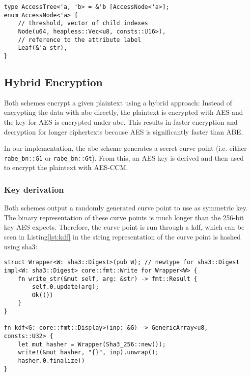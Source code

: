 \begin{lstlisting}[caption={Refined implementation of Access Trees (works without standard library)},label={lst:access-tree-heapless}]
type AccessTree<'a, 'b> = &'b [AccessNode<'a>];
enum AccessNode<'a> {
    // threshold, vector of child indexes
    Node(u64, heapless::Vec<u8, consts::U16>),
    // reference to the attribute label
    Leaf(&'a str),
}
\end{lstlisting}

\subsection{Hybrid Encryption}
Both schemes encrypt a given plaintext using a hybrid approach:
Instead of encrypting the data with \acrshort{abe} directly, the plaintext is encrypted with AES and the key for AES is encrypted under \acrshort{abe}.
This results in faster encryption and decryption for longer ciphertexts because AES is significantly faster than ABE.

In our implementation, the \acrshort{abe} scheme generates a secret curve point (i.e. either \verb+rabe_bn::G1+ or \verb+rabe_bn::Gt+).
From this, an AES key is derived and then used to encrypt the plaintext with AES-CCM.

\subsubsection{Key derivation}
Both schemes output a randomly generated curve point to use as symmetric key.
The binary representation of these curve points is much longer than the 256-bit key AES expects.
Therefore, the curve point is run through a \gls{kdf}, which can be seen in Listing\ref{lst:kdf} in the string representation of the curve point is hashed using \acrshort{sha3}:

\begin{lstlisting}[caption={Hash-based key derivation Function for curve points},label={lst:kdf}]
struct Wrapper<W: sha3::Digest>(pub W); // newtype for sha3::Digest
impl<W: sha3::Digest> core::fmt::Write for Wrapper<W> {
    fn write_str(&mut self, arg: &str) -> fmt::Result {
        self.0.update(arg);
        Ok(())
    }
}

fn kdf<G: core::fmt::Display>(inp: &G) -> GenericArray<u8, consts::U32> {
    let mut hasher = Wrapper(Sha3_256::new());
    write!(&mut hasher, "{}", inp).unwrap();
    hasher.0.finalize()
}
\end{lstlisting}

